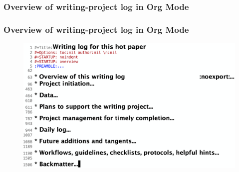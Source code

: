\documentclass[aspectratio=169]{beamer}
\begin{document}
\subsubsection{Overview of writing-project log in Org Mode}
\begin{frame}
\frametitle{Overview of writing-project log in Org Mode}
\begin{center}
\begin{figure}
    \includegraphics[scale=0.235]{Figures/overview.png}
\end{figure}
\end{center}
\end{frame}



\end{document}
